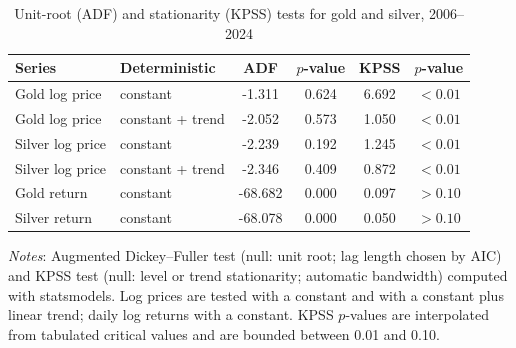 \begin{table}[H]
\centering
\caption{Unit-root (ADF) and stationarity (KPSS) tests for gold and silver, 2006--2024}
\label{tab:unit-root-tests}
\begin{tabular}{llcccc}
\toprule
Series & Deterministic & ADF & $p$-value & KPSS & $p$-value \\
\midrule
Gold log price & constant & -1.311 & 0.624 & 6.692 & $<0.01$ \\
Gold log price & constant + trend & -2.052 & 0.573 & 1.050 & $<0.01$ \\
Silver log price & constant & -2.239 & 0.192 & 1.245 & $<0.01$ \\
Silver log price & constant + trend & -2.346 & 0.409 & 0.872 & $<0.01$ \\
Gold return & constant & -68.682 & 0.000 & 0.097 & $>0.10$ \\
Silver return & constant & -68.078 & 0.000 & 0.050 & $>0.10$ \\
\bottomrule
\end{tabular}
\vspace{0.2cm}
\begin{minipage}{0.9\textwidth}
\footnotesize
\textit{Notes}: Augmented Dickey--Fuller test (null: unit root; lag length chosen by AIC) and KPSS test (null: level or trend stationarity; automatic bandwidth) computed with statsmodels. Log prices are tested with a constant and with a constant plus linear trend; daily log returns with a constant. KPSS $p$-values are interpolated from tabulated critical values and are bounded between 0.01 and 0.10.
\end{minipage}
\end{table}
